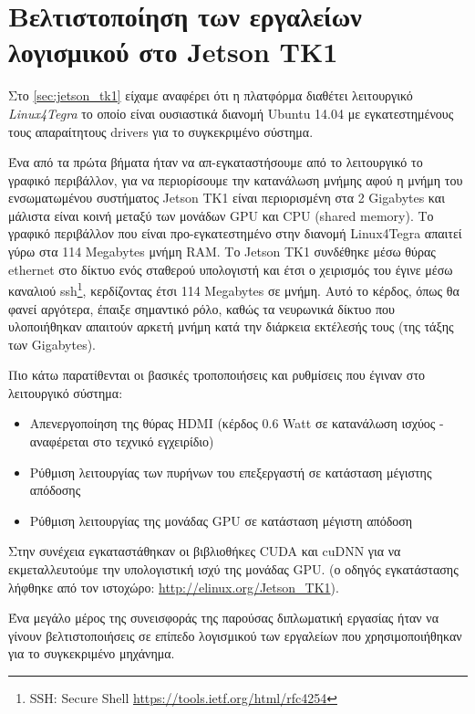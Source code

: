 \section{Βελτιστοποίηση των εργαλείων λογισμικού στο Jetson TK1}
\label{sec:implementations_jetson}

Στο \autoref{sec:jetson_tk1} είχαμε αναφέρει ότι η πλατφόρμα διαθέτει
λειτουργικό \emph{Linux4Tegra} το οποίο είναι ουσιαστικά διανομή Ubuntu 14.04
με εγκατεστημένους τους απαραίτητους drivers για το συγκεκριμένο σύστημα.

Ένα από τα πρώτα βήματα ήταν να απ-εγκαταστήσουμε από το λειτουργικό το
γραφικό περιβάλλον, για να περιορίσουμε την κατανάλωση μνήμης αφού η μνήμη
του ενσωματωμένου συστήματος Jetson TK1 είναι περιορισμένη στα 2 Gigabytes
και μάλιστα είναι κοινή μεταξύ των μονάδων GPU και CPU (shared memory).
Το γραφικό περιβάλλον
που είναι προ-εγκατεστημένο στην διανομή Linux4Tegra απαιτεί γύρω στα 114 Megabytes μνήμη RAM.
Το Jetson TK1 συνδέθηκε
μέσω θύρας ethernet στο δίκτυο ενός σταθερού υπολογιστή και έτσι ο χειρισμός
του έγινε μέσω καναλιού ssh\footnote{SSH: Secure Shell \href{https://tools.ietf.org/html/rfc4254}{{https://tools.ietf.org/html/rfc4254}}},
κερδίζοντας έτσι 114 Megabytes σε μνήμη. Αυτό το κέρδος, όπως θα φανεί
αργότερα, έπαιξε σημαντικό ρόλο, καθώς τα νευρωνικά δίκτυο που υλοποιήθηκαν
απαιτούν αρκετή μνήμη κατά την διάρκεια εκτέλεσής τους (της τάξης των Gigabytes).

Πιο κάτω παρατίθενται οι βασικές τροποποιήσεις και ρυθμίσεις που έγιναν στο λειτουργικό σύστημα:
\begin{itemize}
  \item{Απενεργοποίηση της θύρας HDMI (κέρδος 0.6 Watt
    σε κατανάλωση ισχύος - αναφέρεται στο τεχνικό εγχειρίδιο)}
  \item{Ρύθμιση λειτουργίας των πυρήνων του επεξεργαστή σε κατάσταση μέγιστης απόδοσης}
  \item{Ρύθμιση λειτουργίας της μονάδας GPU σε κατάσταση μέγιστη απόδοση}
\end{itemize}

Στην συνέχεια εγκαταστάθηκαν οι βιβλιοθήκες CUDA και cuDNN για να εκμεταλλευτούμε
την υπολογιστική ισχύ της μονάδας GPU. (ο οδηγός εγκατάστασης λήφθηκε από τον ιστοχώρο: \url{http://elinux.org/Jetson_TK1}).

Ένα μεγάλο μέρος της συνεισφοράς της παρούσας διπλωματική εργασίας
ήταν να γίνουν βελτιστοποιήσεις σε επίπεδο λογισμικού των εργαλείων που χρησιμοποιήθηκαν
για το συγκεκριμένο μηχάνημα.

